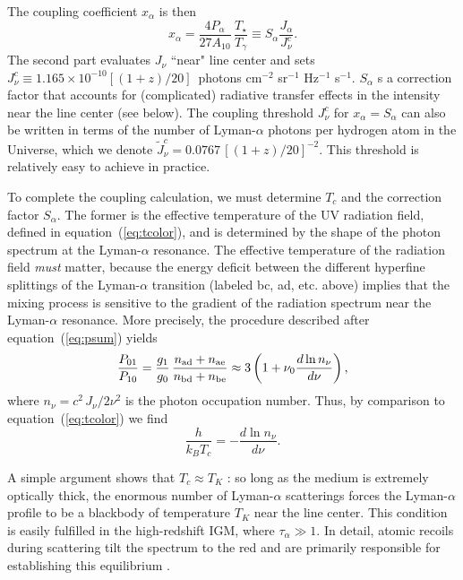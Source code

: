 \documentclass[a4paper,openany, 12pt]{book}
\begin{document}
The coupling coefficient $x_\alpha$ is then
\begin{equation}
x_\alpha = \frac{4 P_\alpha}{27 A_{10}} \, \frac{T_\star}{T_{\gamma}} \equiv S_\alpha \frac{J_\alpha}{J_\nu^c}.
\label{eq:xalpha}
\end{equation}
The second part evaluates $J_\nu$ ``near" line center and sets $J_\nu^c \equiv 1.165 \times 10^{-10} [(1+z)/20]$~photons cm$^{-2}$ sr$^{-1}$ Hz$^{-1}$ s$^{-1}$.   $S_\alpha$ s a correction factor that accounts for (complicated) radiative transfer effects in the intensity near the line center (see below).  The coupling threshold $J_\nu^c$ for $x_\alpha = S_\alpha$ can also be written in terms of the number of Lyman-$\alpha$ photons per hydrogen atom in the Universe, which we denote $\tilde{J}_\nu^c = 0.0767 \, [(1+z)/20]^{-2}$.  This threshold is relatively easy to achieve in practice.

To complete the coupling calculation, we must determine $T_c$ and the correction factor $S_\alpha$.  The former is the effective temperature of the UV radiation field, defined in equation~(\ref{eq:tcolor}), and is determined by the shape of the photon spectrum at the Lyman-$\alpha$ resonance. The effective temperature of the radiation field \emph{must} matter, because the energy deficit between the different hyperfine splittings of the Lyman-$\alpha$ transition (labeled bc, ad, etc. above) implies that the mixing process is sensitive to the gradient of the radiation spectrum near the Lyman-$\alpha$ resonance.  More precisely, the procedure described after equation~(\ref{eq:psum}) yields
\begin{equation}
\frac{P_{01}}{P_{10}} = \frac{g_1}{g_0} \, \frac{n_{\rm ad} + n_{\rm ae}}{n_{\rm bd} + n_{\rm be}} \approx 3 \left( 1 + \nu_0 \frac{d \ln n_\nu}{d \nu} \right),
\label{eq:tcrad1}
\end{equation}
where $n_\nu = c^2 \, J_\nu/2 \nu^2$ is the photon occupation number.
Thus, by comparison to equation~(\ref{eq:tcolor}) we find
\begin{equation}
\frac{h}{k_B T_c} = - \frac{d \ln n_\nu}{d \nu}.
\label{eq:tcrad}
\end{equation}

A simple argument shows that $T_c \approx T_K$ \cite{field59-ts}: so long as the medium is extremely optically thick, the enormous number of Lyman-$\alpha$ scatterings forces the Lyman-$\alpha$ profile to be a blackbody of temperature $T_K$ near the line center.  This condition is easily fulfilled in the high-redshift IGM, where $\tau_\alpha \gg 1$.  In detail, atomic recoils during scattering tilt the spectrum to the red and are primarily responsible for establishing this equilibrium \cite{field59-res}.  
\end{document}
